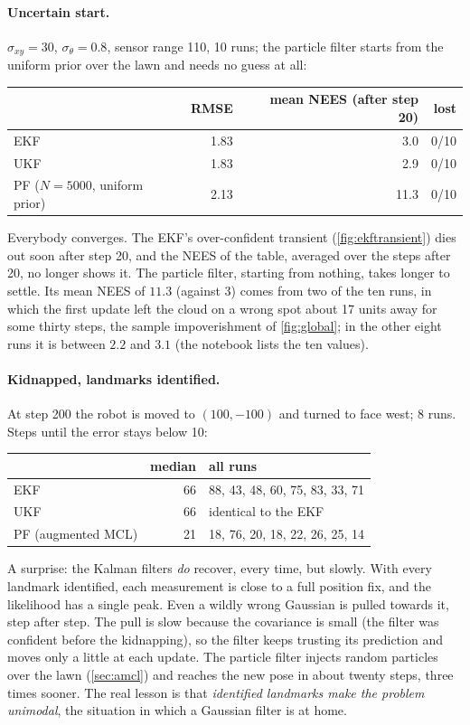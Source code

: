 \paragraph{Uncertain start.} $\sigma_{xy}=30$, $\sigma_\theta=0.8$, sensor
range 110, 10 runs; the particle filter starts from the uniform prior
over the lawn and needs no guess at all:
\begin{center}
\begin{tabular}{@{}lrrr@{}}
\toprule
& RMSE & mean NEES (after step 20) & lost\\
\midrule
EKF & 1.83 & 3.0 & 0/10\\
UKF & 1.83 & 2.9 & 0/10\\
PF ($N=5000$, uniform prior) & 2.13 & 11.3 & 0/10\\
\bottomrule
\end{tabular}
\end{center}
Everybody converges. The EKF's over-confident transient
(\cref{fig:ekftransient}) dies out soon after step 20, and the NEES of the
table, averaged over the steps after 20, no longer shows it. The particle filter, starting
from nothing, takes longer to settle. Its mean NEES of $11.3$ (against
$3$) comes from two of the ten runs, in which the first update left the
cloud on a wrong spot about 17 units away for some thirty steps, the
sample impoverishment of \cref{fig:global}; in the other eight runs it is
between $2.2$ and $3.1$ (the notebook lists the ten values).

\paragraph{Kidnapped, landmarks identified.} At step 200 the robot is
moved to $(100,-100)$ and turned to face west; 8 runs. Steps until the
error stays below 10:
\begin{center}
\begin{tabular}{@{}lrl@{}}
\toprule
& median & all runs\\
\midrule
EKF & 66 & 88, 43, 48, 60, 75, 83, 33, 71\\
UKF & 66 & identical to the EKF\\
PF (augmented MCL) & 21 & 18, 76, 20, 18, 22, 26, 25, 14\\
\bottomrule
\end{tabular}
\end{center}
A surprise: the Kalman filters \emph{do} recover, every time, but slowly.
With every landmark identified, each measurement is close to a full
position fix, and the likelihood has a single peak. Even a wildly wrong
Gaussian is pulled towards it, step after step. The pull is slow because
the covariance is small (the filter was confident before the kidnapping),
so the filter keeps trusting its prediction and moves only a little at
each update. The particle filter injects random particles over the lawn
(\cref{sec:amcl}) and reaches the new pose in about twenty steps, three times sooner. The real lesson is that \emph{identified landmarks
make the problem unimodal}, the situation in which a Gaussian filter is
at home.

